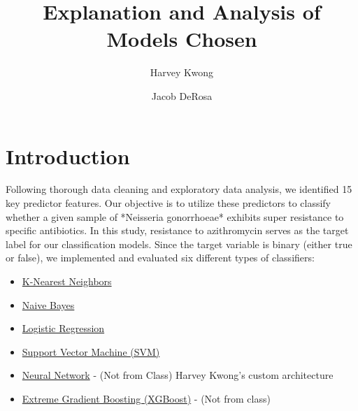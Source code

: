 \documentclass[manuscript,screen,review, nonacm]{acmart}
\begin{document}
\title{Explanation and Analysis of Models Chosen}

\author{Harvey Kwong}
\author{Jacob DeRosa}


\maketitle

\section{Introduction}

Following thorough data cleaning and exploratory data analysis, we identified 15 key predictor 
features. Our objective is to utilize these predictors to classify whether a given sample of 
*Neisseria gonorrhoeae* exhibits super resistance to specific antibiotics. In this study, 
resistance to azithromycin serves as the target label for our classification models. Since 
the target variable is binary (either true or false), we implemented and evaluated six 
different types of classifiers:
  
  \begin{itemize}
      \item \href{https://scikit-learn.org/stable/modules/generated/sklearn.neighbors.KNeighborsClassifier.html}{K-Nearest Neighbors}
      \item \href{https://scikit-learn.org/stable/modules/naive_bayes.html}{Naive Bayes}
      \item \href{https://scikit-learn.org/stable/modules/generated/sklearn.linear_model.LogisticRegression.html}{Logistic Regression}
      \item \href{https://scikit-learn.org/stable/modules/svm.html}{Support Vector Machine (SVM)}
      \item \href{https://www.tensorflow.org/api_docs/python/tf/keras/Sequential}{Neural Network} - (Not from Class) Harvey Kwong's custom architecture
      \item \href{https://xgboost.readthedocs.io/en/stable/get_started.html}{Extreme Gradient Boosting (XGBoost)} - (Not from class)
  \end{itemize}
  
\end{document}
